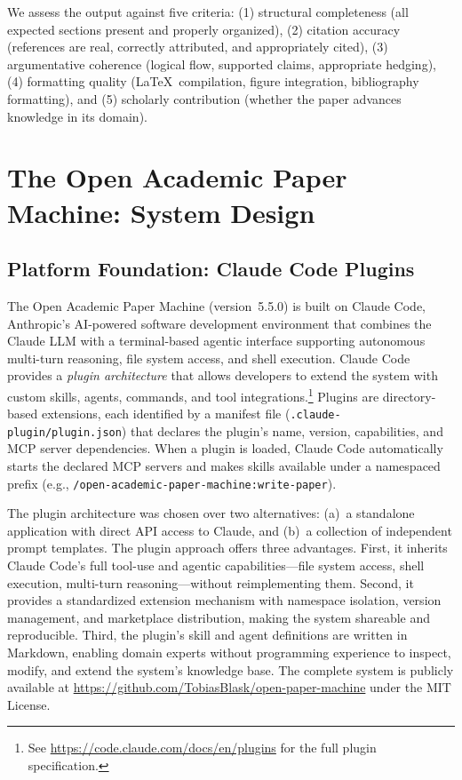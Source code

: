 \documentclass{article}
\begin{document}
We assess the output against five criteria: (1) structural completeness (all expected sections present and properly organized), (2) citation accuracy (references are real, correctly attributed, and appropriately cited), (3) argumentative coherence (logical flow, supported claims, appropriate hedging), (4) formatting quality (\LaTeX\ compilation, figure integration, bibliography formatting), and (5) scholarly contribution (whether the paper advances knowledge in its domain).


\section{The Open Academic Paper Machine: System Design}

\subsection{Platform Foundation: Claude Code Plugins}

The Open Academic Paper Machine (version~5.5.0) is built on Claude Code, Anthropic's AI-powered software development environment that combines the Claude LLM with a terminal-based agentic interface supporting autonomous multi-turn reasoning, file system access, and shell execution. Claude Code provides a \emph{plugin architecture} that allows developers to extend the system with custom skills, agents, commands, and tool integrations.\footnote{See \url{https://code.claude.com/docs/en/plugins} for the full plugin specification.} Plugins are directory-based extensions, each identified by a manifest file (\texttt{.claude-plugin/plugin.json}) that declares the plugin's name, version, capabilities, and MCP server dependencies. When a plugin is loaded, Claude Code automatically starts the declared MCP servers and makes skills available under a namespaced prefix (e.g., \texttt{/open-academic-paper-machine:write-paper}).

The plugin architecture was chosen over two alternatives: (a)~a standalone application with direct API access to Claude, and (b)~a collection of independent prompt templates. The plugin approach offers three advantages. First, it inherits Claude Code's full tool-use and agentic capabilities---file system access, shell execution, multi-turn reasoning---without reimplementing them. Second, it provides a standardized extension mechanism with namespace isolation, version management, and marketplace distribution, making the system shareable and reproducible. Third, the plugin's skill and agent definitions are written in Markdown, enabling domain experts without programming experience to inspect, modify, and extend the system's knowledge base. The complete system is publicly available at \url{https://github.com/TobiasBlask/open-paper-machine} under the MIT License.
\end{document}
